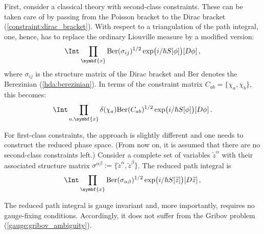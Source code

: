     First, consider a classical theory with second-class constraints. These can be taken care of by passing from the Poisson bracket to the Dirac bracket (\cref{constraint:dirac_bracket}). With respect to a triangulation of the path integral, one, hence, has to replace the ordinary Liouville measure by a modified version:
    \begin{gather}
        \Int\prod_{\symbf{x}}\mathrm{Ber}(\sigma_{ij})^{1/2}\exp\bigl(i/\hbar S[\phi]\bigr)[D\phi]\,,
    \end{gather}
    where $\sigma_{ij}$ is the structure matrix of the Dirac bracket and $\mathrm{Ber}$ denotes the Berezinian (\cref{hda:berezinian}). In terms of the constraint matrix $C_{ab}=\{\chi_a,\chi_b\}$, this becomes:
    \begin{gather}
        \Int\prod_{a,\symbf{x}}\delta(\chi_a)\mathrm{Ber}(C_{ab})^{1/2}\exp\bigl(i/\hbar S[\phi]\bigr)[D\phi]\,.
    \end{gather}

    For first-class constraints, the approach is slightly different and one needs to construct the reduced phase space. (From now on, it is assumed that there are no second-class constraints left.) Consider a complete set of variables $\widetilde{z}^\alpha$ with their associated structure matrix $\sigma^{\alpha\beta}:=\{\widetilde{z}^\alpha,\widetilde{z}^\beta\}$. The reduced path integral is
    \begin{gather}
        \Int\prod_{\symbf{x}}\mathrm{Ber}(\sigma_{\alpha\beta})^{1/2}\exp\bigl(i/\hbar S[\widetilde{z}]\bigr)[D\widetilde{z}]\,,
    \end{gather}

    \begin{remark}
        The reduced path integral is gauge invariant and, more importantly, requires no gauge-fixing conditions. Accordingly, it does not suffer from the Gribov problem (\cref{gauge:gribov_ambiguity}).
    \end{remark}

